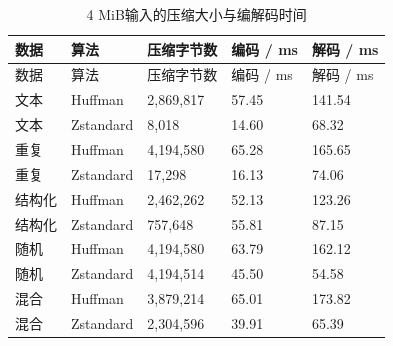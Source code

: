 \begin{longtable}{L{.13\linewidth}L{.15\linewidth}R{.20\linewidth}R{.18\linewidth}R{.18\linewidth}}
\caption{4 MiB输入的压缩大小与编解码时间}\label{tab:codec-performance}\\\toprule 数据 & 算法 & 压缩字节数 & 编码 / ms & 解码 / ms\\\midrule\endfirsthead
\toprule 数据 & 算法 & 压缩字节数 & 编码 / ms & 解码 / ms\\\midrule\endhead
\bottomrule\endfoot
文本 & Huffman & 2,869,817 & 57.45 & 141.54\\
文本 & Zstandard & 8,018 & 14.60 & 68.32\\
重复 & Huffman & 4,194,580 & 65.28 & 165.65\\
重复 & Zstandard & 17,298 & 16.13 & 74.06\\
结构化 & Huffman & 2,462,262 & 52.13 & 123.26\\
结构化 & Zstandard & 757,648 & 55.81 & 87.15\\
随机 & Huffman & 4,194,580 & 63.79 & 162.12\\
随机 & Zstandard & 4,194,514 & 45.50 & 54.58\\
混合 & Huffman & 3,879,214 & 65.01 & 173.82\\
混合 & Zstandard & 2,304,596 & 39.91 & 65.39\\
\end{longtable}
